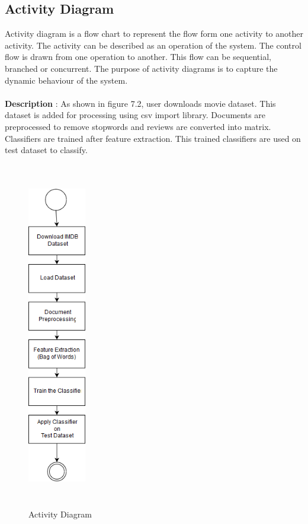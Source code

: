 \documentclass[oneside,a4paper,12pt]{pictreport}
\begin{document}
\subsection{Activity Diagram}
Activity diagram is a flow chart to represent the flow form one activity to another activity. The activity can be described as an operation of the system. The control flow is drawn from one operation to another. This flow can be sequential, branched or concurrent. The purpose of activity diagrams is to capture the dynamic behaviour of the system.\\\\
\textbf{Description} : As shown in figure 7.2, user downloads movie dataset. This dataset is added for processing using csv import 
library. Documents are preprocessed to remove stopwords and reviews are converted into matrix. Classifiers are trained after feature extraction. This trained classifiers are used on test dataset to classify.
\begin{figure}[h!]
\begin{center}
 

\includegraphics[width=1.0in,height=6.0in]{Activity.png}
\caption{Activity Diagram}
\end{center}

\end{figure}
\newpage
\end{document}
